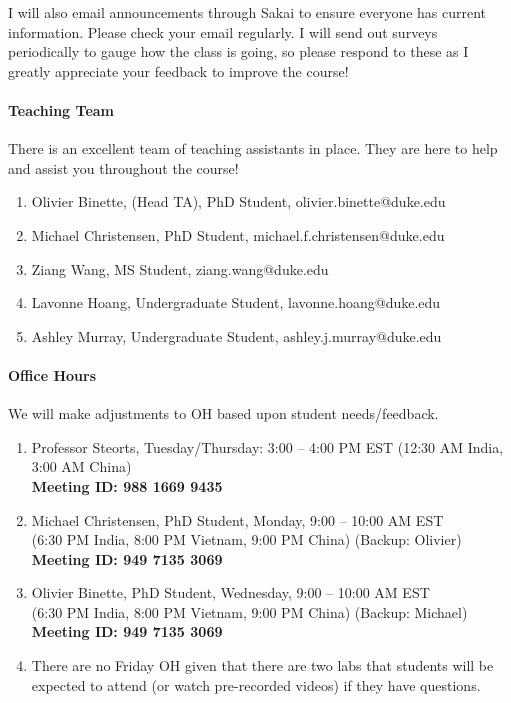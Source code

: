 \documentclass[11pt]{article}
\begin{document}
I will also email announcements through Sakai to ensure everyone has current information. Please check your email regularly. I will send out surveys periodically to gauge how the class is going, so please respond to these as I greatly appreciate your feedback to improve the course! 

\paragraph{Teaching Team}
There is an excellent team of teaching assistants in place. They are here to help and assist you throughout the course! 

\begin{enumerate}
\item Olivier Binette, (Head TA), PhD Student, olivier.binette@duke.edu
\item Michael Christensen, PhD Student, michael.f.christensen@duke.edu
\item Ziang Wang, MS Student, ziang.wang@duke.edu
\item Lavonne Hoang, Undergraduate Student, lavonne.hoang@duke.edu
\item Ashley Murray, Undergraduate Student, ashley.j.murray@duke.edu
\end{enumerate}


\paragraph{Office Hours}
We will make adjustments to OH based upon student needs/feedback. 
\begin{enumerate}
\item Professor Steorts, Tuesday/Thursday: 3:00 -- 4:00 PM EST (12:30 AM India, 3:00 AM China) \\
\textbf{Meeting ID: 988 1669 9435}
\item Michael Christensen, PhD Student, Monday, 9:00 -- 10:00 AM EST \\(6:30 PM India, 8:00 PM Vietnam, 9:00 PM China) (Backup: Olivier)\\
\textbf{Meeting ID: 949 7135 3069}\\
\item Olivier Binette, PhD Student, Wednesday, 9:00 -- 10:00 AM EST \\(6:30 PM India, 8:00 PM Vietnam, 9:00 PM China) (Backup: Michael)\\
\textbf{Meeting ID: 949 7135 3069}\\
\item There are no Friday OH given that there are two labs that students will be expected to attend (or watch pre-recorded videos) if they have questions. 
\end{enumerate}
\end{document}
